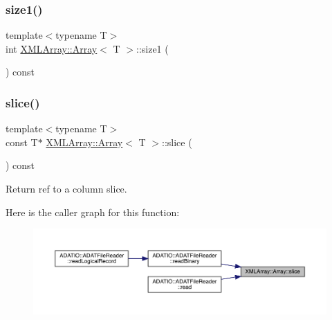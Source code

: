 \mbox{\label{classXMLArray_1_1Array_a33e863988af56d045439d31058088c8c}} 
\subsubsection{\texorpdfstring{size1()}{size1()}\hspace{0.1cm}{\footnotesize\ttfamily [2/2]}}
{\footnotesize\ttfamily template$<$typename T$>$ \\
int \mbox{\hyperlink{classXMLArray_1_1Array}{X\+M\+L\+Array\+::\+Array}}$<$ T $>$\+::size1 (\begin{DoxyParamCaption}{ }\end{DoxyParamCaption}) const\hspace{0.3cm}{\ttfamily [inline]}}

\mbox{\label{classXMLArray_1_1Array_a9c9e3fdc44557d1241103c207f7f69af}} 
\subsubsection{\texorpdfstring{slice()}{slice()}\hspace{0.1cm}{\footnotesize\ttfamily [1/2]}}
{\footnotesize\ttfamily template$<$typename T$>$ \\
const T$\ast$ \mbox{\hyperlink{classXMLArray_1_1Array}{X\+M\+L\+Array\+::\+Array}}$<$ T $>$\+::slice (\begin{DoxyParamCaption}{ }\end{DoxyParamCaption}) const\hspace{0.3cm}{\ttfamily [inline]}}



Return ref to a column slice. 

Here is the caller graph for this function\+:\nopagebreak
\begin{figure}[H]
\begin{center}
\leavevmode
\includegraphics[width=350pt]{db/d6c/classXMLArray_1_1Array_a9c9e3fdc44557d1241103c207f7f69af_icgraph}
\end{center}
\end{figure}
\mbox{\label{classXMLArray_1_1Array_a9c9e3fdc44557d1241103c207f7f69af}} 
